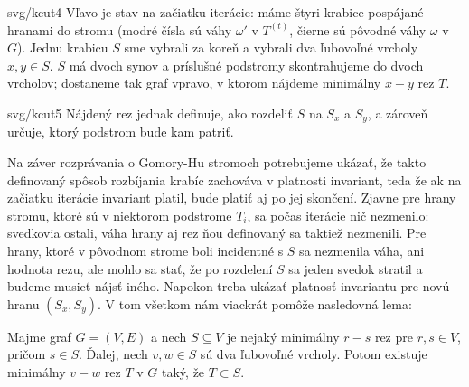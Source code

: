 \begin{myfig}{\textwidth}{svg/kcut4}
  Vľavo je stav na začiatku iterácie: máme štyri krabice pospájané hranami do stromu (modré
  čísla sú váhy $\omega'$ v $T^{(t)}$, čierne sú pôvodné váhy $\omega$ v $G$).
  Jednu krabicu $S$ sme vybrali za koreň a vybrali dva ľubovoľné vrcholy $x,y\in S$.
  $S$ má dvoch synov a príslušné podstromy skontrahujeme do dvoch vrcholov; dostaneme tak graf vpravo,
  v ktorom nájdeme minimálny $x-y$ rez $T$. 
\end{myfig}



\begin{myfig}{\textwidth}{svg/kcut5}
Nájdený rez jednak definuje, ako rozdeliť $S$ na $S_x$ a $S_y$, a zároveň určuje, ktorý podstrom bude kam patriť.
\end{myfig}

Na záver rozprávania o Gomory-Hu stromoch potrebujeme ukázať, že takto definovaný spôsob rozbíjania krabíc
zachováva v platnosti invariant, teda že ak na začiatku iterácie invariant platil, bude platiť aj po jej skončení.
Zjavne pre hrany stromu, ktoré sú v niektorom podstrome $T_i$, sa počas iterácie nič nezmenilo: svedkovia ostali,
váha hrany aj rez ňou definovaný sa taktiež nezmenili. Pre hrany, ktoré v pôvodnom strome boli incidentné s $S$
sa nezmenila váha, ani hodnota rezu, ale mohlo sa stať, že po rozdelení $S$ sa jeden svedok stratil a budeme
musieť nájsť iného. Napokon
treba ukázať platnosť invariantu pre novú hranu $(S_x,S_y)$. 
V tom všetkom nám viackrát pomôže nasledovná lema:

\begin{lema}
  \label{lm:kcutlema}
  Majme graf $G=(V,E)$ a nech $S\subseteq V$ je nejaký minimálny $r-s$ rez pre $r,s\in V$, pričom $s\in S$.
  Ďalej, nech $v,w\in S$ sú dva ľubovoľné vrcholy. Potom existuje minimálny $v-w$ rez $T$ v $G$ taký, že 
  $T\subset S$.
\end{lema}

